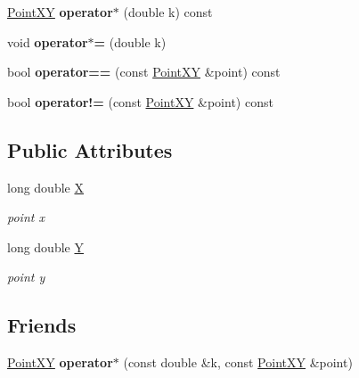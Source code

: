 \begin{DoxyCompactItemize}
\item 
\hypertarget{classPointXY_a6ce939a48ba2f22460762da7c79e86c5}{}\hyperlink{classPointXY}{Point\+X\+Y} {\bfseries operator$\ast$} (double k) const \label{classPointXY_a6ce939a48ba2f22460762da7c79e86c5}

\item 
\hypertarget{classPointXY_a5df03dbc2757ffe8c5db61cfabb24f20}{}void {\bfseries operator$\ast$=} (double k)\label{classPointXY_a5df03dbc2757ffe8c5db61cfabb24f20}

\item 
\hypertarget{classPointXY_a51f8be09d28e4f060205f96fb3e82ff9}{}bool {\bfseries operator==} (const \hyperlink{classPointXY}{Point\+X\+Y} \&point) const \label{classPointXY_a51f8be09d28e4f060205f96fb3e82ff9}

\item 
\hypertarget{classPointXY_adfd80277c5f774c724426205007e87df}{}bool {\bfseries operator!=} (const \hyperlink{classPointXY}{Point\+X\+Y} \&point) const \label{classPointXY_adfd80277c5f774c724426205007e87df}

\end{DoxyCompactItemize}
\subsection*{Public Attributes}
\begin{DoxyCompactItemize}
\item 
\hypertarget{classPointXY_a134e66580fce7d7c4c7f0a6fb80f3040}{}long double \hyperlink{classPointXY_a134e66580fce7d7c4c7f0a6fb80f3040}{X}\label{classPointXY_a134e66580fce7d7c4c7f0a6fb80f3040}

\begin{DoxyCompactList}\small\item\em point x \end{DoxyCompactList}\item 
\hypertarget{classPointXY_a9e1a37c00a0fec942609fcd9185d1a10}{}long double \hyperlink{classPointXY_a9e1a37c00a0fec942609fcd9185d1a10}{Y}\label{classPointXY_a9e1a37c00a0fec942609fcd9185d1a10}

\begin{DoxyCompactList}\small\item\em point y \end{DoxyCompactList}\end{DoxyCompactItemize}
\subsection*{Friends}
\begin{DoxyCompactItemize}
\item 
\hypertarget{classPointXY_a5f925e3bd89f64d9565b4591988c9bdf}{}\hyperlink{classPointXY}{Point\+X\+Y} {\bfseries operator$\ast$} (const double \&k, const \hyperlink{classPointXY}{Point\+X\+Y} \&point)\label{classPointXY_a5f925e3bd89f64d9565b4591988c9bdf}

\end{DoxyCompactItemize}



